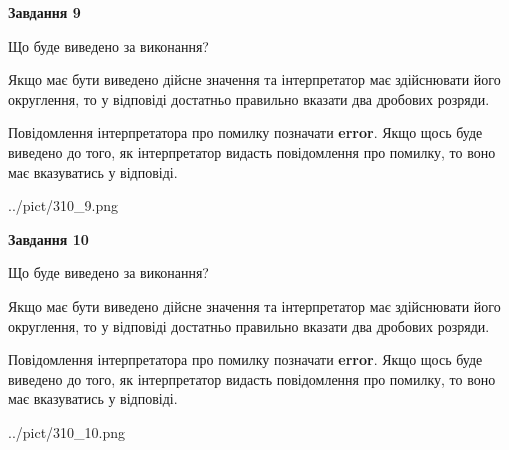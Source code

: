 \documentclass[12pt, ukrainian]{article}
\begin{document}
{\begin {Large}
{\begin {center}\textbf{Завдання 9}\end {center}}\par
Що буде виведено за виконання? \par

Якщо має бути виведено дійсне значення та інтерпретатор має здійснювати його округлення, 
то у відповіді достатньо правильно вказати два дробових розряди.

Повідомлення інтерпретатора про помилку позначати \textbf{error}.
Якщо щось буде виведено до того, як інтерпретатор видасть повідомлення про помилку, 
то воно має вказуватись у відповіді. \par

\begin{center}
	{../pict/310_9.png}
\end{center}
\newpage

{\begin {center}\textbf{Завдання 10}\end {center}}\par
Що буде виведено за виконання? \par

Якщо має бути виведено дійсне значення та інтерпретатор має здійснювати його округлення, 
то у відповіді достатньо правильно вказати два дробових розряди.

Повідомлення інтерпретатора про помилку позначати \textbf{error}.
Якщо щось буде виведено до того, як інтерпретатор видасть повідомлення про помилку, 
то воно має вказуватись у відповіді. \par

\begin{center}
	{../pict/310_10.png}
\end{center}
\newpage

\end {Large}}
\end{document}
